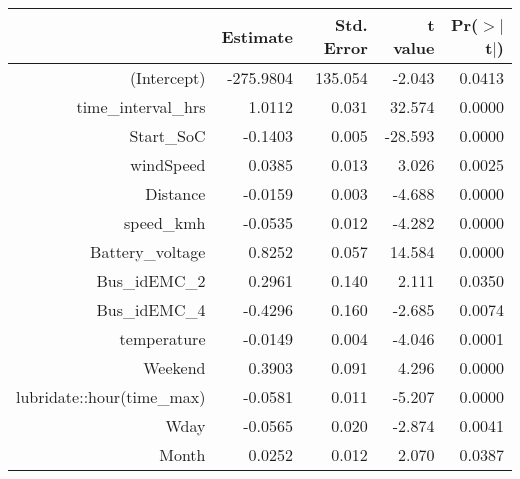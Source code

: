 \begin{table}[ht]
\centering
\begin{tabular}{rrrrr}
  \hline
 & Estimate & Std. Error & t value & Pr($>$$|$t$|$) \\ 
  \hline
(Intercept) & -275.9804 & 135.054 & -2.043 & 0.0413 \\ 
  time\_interval\_hrs & 1.0112 & 0.031 & 32.574 & 0.0000 \\ 
  Start\_SoC & -0.1403 & 0.005 & -28.593 & 0.0000 \\ 
  windSpeed & 0.0385 & 0.013 & 3.026 & 0.0025 \\ 
  Distance & -0.0159 & 0.003 & -4.688 & 0.0000 \\ 
  speed\_kmh & -0.0535 & 0.012 & -4.282 & 0.0000 \\ 
  Battery\_voltage & 0.8252 & 0.057 & 14.584 & 0.0000 \\ 
  Bus\_idEMC\_2 & 0.2961 & 0.140 & 2.111 & 0.0350 \\ 
  Bus\_idEMC\_4 & -0.4296 & 0.160 & -2.685 & 0.0074 \\ 
  temperature & -0.0149 & 0.004 & -4.046 & 0.0001 \\ 
  Weekend & 0.3903 & 0.091 & 4.296 & 0.0000 \\ 
  lubridate::hour(time\_max) & -0.0581 & 0.011 & -5.207 & 0.0000 \\ 
  Wday & -0.0565 & 0.020 & -2.874 & 0.0041 \\ 
  Month & 0.0252 & 0.012 & 2.070 & 0.0387 \\ 
   \hline
\end{tabular}
\end{table}
